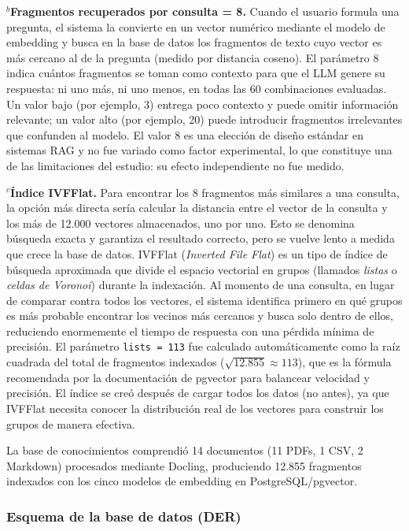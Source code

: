 \documentclass{article}
\begin{document}
\medskip
\noindent $^{b}$\textbf{Fragmentos recuperados por consulta = 8.} Cuando el
usuario formula una pregunta, el sistema la convierte en un vector numérico
mediante el modelo de embedding y busca en la base de datos los fragmentos de
texto cuyo vector es más cercano al de la pregunta (medido por distancia
coseno). El parámetro 8 indica cuántos fragmentos se toman como contexto para
que el LLM genere su respuesta: ni uno más, ni uno menos, en todas las 60
combinaciones evaluadas. Un valor bajo (por ejemplo, 3) entrega poco contexto y
puede omitir información relevante; un valor alto (por ejemplo, 20) puede
introducir fragmentos irrelevantes que confunden al modelo. El valor 8 es una
elección de diseño estándar en sistemas RAG y no fue variado como factor
experimental, lo que constituye una de las limitaciones del estudio: su efecto
independiente no fue medido.

\medskip
\noindent $^{c}$\textbf{Índice IVFFlat.} Para encontrar los 8 fragmentos más
similares a una consulta, la opción más directa sería calcular la distancia
entre el vector de la consulta y los más de 12.000 vectores almacenados, uno
por uno. Esto se denomina búsqueda exacta y garantiza el resultado correcto,
pero se vuelve lento a medida que crece la base de datos. IVFFlat
(\textit{Inverted File Flat}) es un tipo de índice de búsqueda aproximada que
divide el espacio vectorial en grupos (llamados \textit{listas} o
\textit{celdas de Voronoi}) durante la indexación. Al momento de una consulta,
en lugar de comparar contra todos los vectores, el sistema identifica
primero en qué grupos es más probable encontrar los vecinos más cercanos y
busca solo dentro de ellos, reduciendo enormemente el tiempo de respuesta con
una pérdida mínima de precisión. El parámetro \texttt{lists = 113} fue
calculado automáticamente como la raíz cuadrada del total de fragmentos
indexados ($\sqrt{12.855} \approx 113$), que es la fórmula recomendada por la
documentación de pgvector para balancear velocidad y precisión. El índice se
creó después de cargar todos los datos (no antes), ya que IVFFlat necesita
conocer la distribución real de los vectores para construir los grupos de
manera efectiva.

La base de conocimientos comprendió 14 documentos (11 PDFs, 1 CSV, 2 Markdown)
procesados mediante Docling, produciendo 12.855 fragmentos indexados con los
cinco modelos de embedding en PostgreSQL/pgvector.

\subsubsection*{Esquema de la base de datos (DER)}
\end{document}
